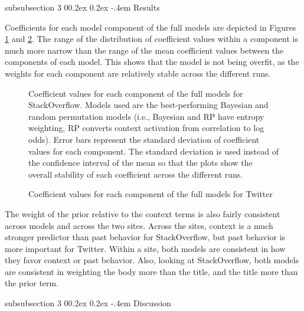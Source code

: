 \documentclass[man,floatsintext,donotrepeattitle]{apa6}
\makeatletter
\renewcommand{\subsubsection}{%
  \@startsection
  {subsubsection}%
  {3}%
  {\parindent}%
  {0\baselineskip \@plus 0.2ex \@minus 0.2ex}%
  {-.4em}%
  {\normalfont\normalsize\bfseries\addperi}}
\makeatother
\begin{document}
\subsubsection{Results}

Coefficients for each model component of the full models are depicted in Figures \ref{figContextCoeffSO} and \ref{figContextCoeffT}.
The range of the distribution of coefficient values within a component is much more narrow than the range of the mean coefficient values between the components of each model.
This shows that the model is not being overfit, as the weights for each component are relatively stable across the different runs.

\begin{figure}[!htbp]
  \caption{
    Coefficient values for each component of the full models for StackOverflow.
    Models used are the best-performing Bayesian and random permutation models
    (i.e., Bayesian and RP have entropy weighting, RP converts context activation from correlation to log odds).
    Error bars represent the standard deviation of coefficient values for each component.
    The standard deviation is used instead of the confidence interval of the mean so that the plots show the overall stability of each coefficient across the different runs.
  }
  \label{figContextCoeffSO}
\end{figure}

\begin{figure}[!htbp]
  \caption{Coefficient values for each component of the full models for Twitter}
  \label{figContextCoeffT}
\end{figure}

The weight of the prior relative to the context terms is also fairly consistent across models and across the two sites.
Across the sites, context is a much stronger predictor than past behavior for StackOverflow, but past behavior is more important for Twitter. 
Within a site, both models are consistent in how they favor context or past behavior.
Also, looking at StackOverflow, both models are consistent in weighting the body more than the title, and the title more than the prior term.

\subsubsection{Discussion}
\end{document}
